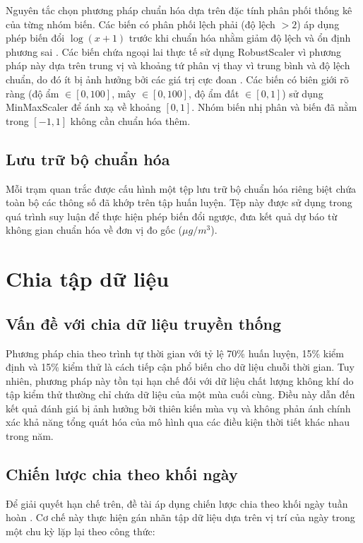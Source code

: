 Nguyên tắc chọn phương pháp chuẩn hóa dựa trên đặc tính phân phối thống kê của từng nhóm biến. Các biến có phân phối lệch phải (độ lệch $> 2$) áp dụng phép biến đổi $\log(x+1)$ trước khi chuẩn hóa nhằm giảm độ lệch và ổn định phương sai \cite{pedregosa2011sklearn}. Các biến chứa ngoại lai thực tế sử dụng RobustScaler vì phương pháp này dựa trên trung vị và khoảng tứ phân vị thay vì trung bình và độ lệch chuẩn, do đó ít bị ảnh hưởng bởi các giá trị cực đoan \cite{rousseeuw1993robust}. Các biến có biên giới rõ ràng (độ ẩm $\in [0, 100]$, mây $\in [0, 100]$, độ ẩm đất $\in [0, 1]$) sử dụng MinMaxScaler để ánh xạ về khoảng $[0, 1]$. Nhóm biến nhị phân và biến đã nằm trong $[-1, 1]$ không cần chuẩn hóa thêm.

\subsection{Lưu trữ bộ chuẩn hóa}

Mỗi trạm quan trắc được cấu hình một tệp lưu trữ bộ chuẩn hóa riêng biệt chứa toàn bộ các thông số đã khớp trên tập huấn luyện. Tệp này được sử dụng trong quá trình suy luận để thực hiện phép biến đổi ngược, đưa kết quả dự báo từ không gian chuẩn hóa về đơn vị đo gốc ($\mu g/m^3$).
\section{Chia tập dữ liệu}

\subsection{Vấn đề với chia dữ liệu truyền thống}

Phương pháp chia theo trình tự thời gian với tỷ lệ 70\% huấn luyện, 15\% kiểm định và 15\% kiểm thử là cách tiếp cận phổ biến cho dữ liệu chuỗi thời gian. Tuy nhiên, phương pháp này tồn tại hạn chế đối với dữ liệu chất lượng không khí do tập kiểm thử thường chỉ chứa dữ liệu của một mùa cuối cùng. Điều này dẫn đến kết quả đánh giá bị ảnh hưởng bởi thiên kiến mùa vụ và không phản ánh chính xác khả năng tổng quát hóa của mô hình qua các điều kiện thời tiết khác nhau trong năm.

\subsection{Chiến lược chia theo khối ngày}

Để giải quyết hạn chế trên, đề tài áp dụng chiến lược chia theo khối ngày tuần hoàn \cite{bergmeir2018cv}. Cơ chế này thực hiện gán nhãn tập dữ liệu dựa trên vị trí của ngày trong một chu kỳ lặp lại theo công thức:

